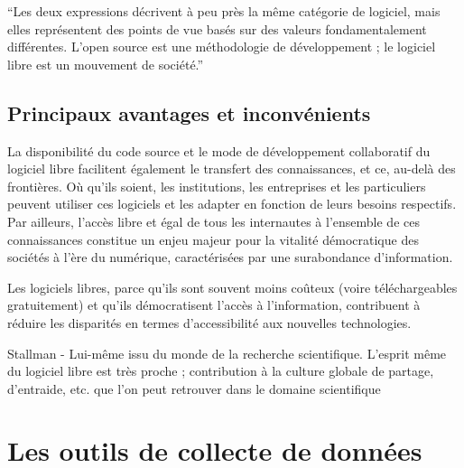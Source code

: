 \documentclass[
  letterpaper,
]{scrbook}
\begin{document}
``Les deux expressions décrivent à peu près la même catégorie de
logiciel, mais elles représentent des points de vue basés sur des
valeurs fondamentalement différentes. L'open source est une méthodologie
de développement ; le logiciel libre est un mouvement de société.''

\hypertarget{principaux-avantages-et-inconvuxe9nients}{%
\section{Principaux avantages et
inconvénients}\label{principaux-avantages-et-inconvuxe9nients}}

La disponibilité du code source et le mode de développement collaboratif
du logiciel libre facilitent également le transfert des connaissances,
et ce, au-delà des frontières. Où qu'ils soient, les institutions, les
entreprises et les particuliers peuvent utiliser ces logiciels et les
adapter en fonction de leurs besoins respectifs. Par ailleurs, l'accès
libre et égal de tous les internautes à l'ensemble de ces connaissances
constitue un enjeu majeur pour la vitalité démocratique des sociétés à
l'ère du numérique, caractérisées par une surabondance d'information.

Les logiciels libres, parce qu'ils sont souvent moins coûteux (voire
téléchargeables gratuitement) et qu'ils démocratisent l'accès à
l'information, contribuent à réduire les disparités en termes
d'accessibilité aux nouvelles technologies.

Stallman - Lui-même issu du monde de la recherche scientifique. L'esprit
même du logiciel libre est très proche ; contribution à la culture
globale de partage, d'entraide, etc. que l'on peut retrouver dans le
domaine scientifique


\hypertarget{les-outils-de-collecte-de-donnuxe9es}{%
\chapter{Les outils de collecte de
données}\label{les-outils-de-collecte-de-donnuxe9es}}
\end{document}
